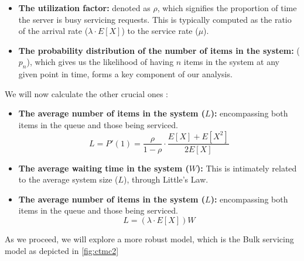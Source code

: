 \documentclass{article}
\begin{document}
\begin{itemize}
    \item \textbf{The utilization factor:} denoted as $\rho$, which signifies the proportion of time the server is busy servicing requests. This is typically computed as the ratio of the arrival rate ($\lambda\cdot E[X]$) to the service rate ($\mu$).

    \item \textbf{The probability distribution of the number of items in the system:}  ($p_n$), which gives us the likelihood of having $n$ items in the system at any given point in time, forms a key component of our analysis.
    
\end{itemize} 
We will now calculate the other crucial ones :
\begin{itemize}
    \item \textbf{The average number of items in the system ($L$):} encompassing both items in the queue and those being serviced.
    \begin{equation*}
    \boxed{L =  P'(1)=\frac{\rho}{1-\rho}\cdot \frac{E[X] + E[X^2]}{2E[X]}}
    \end{equation*}

    \item \textbf{The average waiting time in the system ($W$):} This is intimately related to the average system size ($L$), through Little's Law.
    \item \textbf{The average number of items in the system ($L$):} encompassing both items in the queue and those being serviced.
    \begin{equation*}
    \boxed{L=\left(\lambda\cdot E[X] \right)W}
    \end{equation*}
\end{itemize}
As we proceed, we will explore a more robust model, which is the Bulk servicing model as depicted in \ref{fig:ctmc2}
\end{document}
